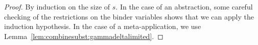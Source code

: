 \documentclass{lmcs}
\theoremstyle{theorem}\newtheorem{theorem}{Theorem}
\theoremstyle{theorem}\newtheorem{lemma}[theorem]{Lemma}
\theoremstyle{theorem}\newtheorem{corollary}[theorem]{Corollary}
\theoremstyle{definition}\newtheorem{definition}[theorem]{Definition}
\theoremstyle{definition}\newtheorem{example}[theorem]{Example}
\newcommand{\V}{\mathcal{V}}
\newcommand{\FV}{\mathit{FV}}
\newcommand{\domain}{\mathtt{dom}}
\newcommand{\identifier}[1]{\mathtt{#1}}
\newcommand{\afun}{\identifier{f}}
\newcommand{\avar}{x}
\newcommand{\bvar}{y}
\newcommand{\cvar}{z}
\newcommand{\abs}[2]{\lambda #1.#2}
\newcommand{\tuple}[2]{\llparenthesis #1,\dots,#2 \rrparenthesis}
\begin{document}
\begin{proof}
By induction on the size of $s$.
In the case of an abstraction, some careful checking of the restrictions on the
binder variables shows that we can apply the induction hypothesis.  In the case
of a meta-application, we use Lemma~\ref{lem:combinesubst:gammadeltalimited}.

\end{proof}
\end{document}
